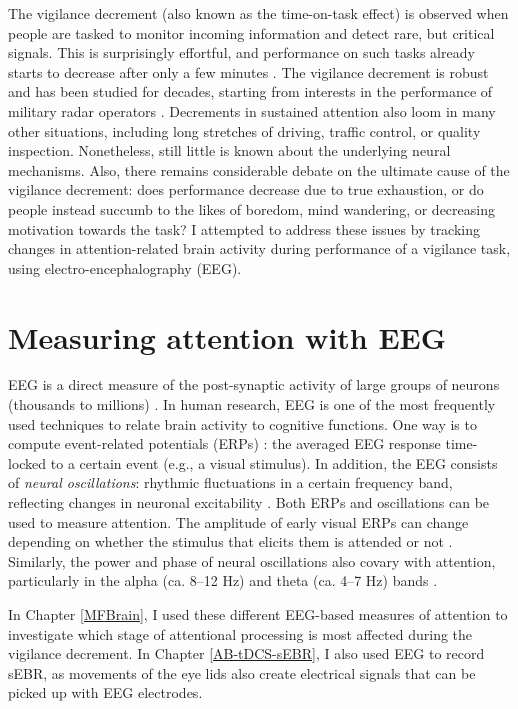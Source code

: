 \documentclass[11pt,]{memoir}
\begin{document}
The vigilance decrement (also known as the time-on-task effect) is observed when people are tasked to monitor incoming information and detect rare, but critical signals. This is surprisingly effortful, and performance on such tasks already starts to decrease after only a few minutes \autocite{Warm2008}. The vigilance decrement is robust and has been studied for decades, starting from interests in the performance of military radar operators \autocite{Mackworth1948}. Decrements in sustained attention also loom in many other situations, including long stretches of driving, traffic control, or quality inspection. Nonetheless, still little is known about the underlying neural mechanisms. Also, there remains considerable debate on the ultimate cause of the vigilance decrement: does performance decrease due to true exhaustion, or do people instead succumb to the likes of boredom, mind wandering, or decreasing motivation towards the task? I attempted to address these issues by tracking changes in attention-related brain activity during performance of a vigilance task, using electro-encephalography (EEG).

\hypertarget{measuring-attention-with-eeg}{%
\section{Measuring attention with EEG}\label{measuring-attention-with-eeg}}

EEG is a direct measure of the post-synaptic activity of large groups of neurons (thousands to millions) \autocite{Cohen2017}. In human research, EEG is one of the most frequently used techniques to relate brain activity to cognitive functions. One way is to compute event-related potentials (ERPs) \autocite{Luck2005}: the averaged EEG response time-locked to a certain event (e.g., a visual stimulus). In addition, the EEG consists of \emph{neural oscillations}: rhythmic fluctuations in a certain frequency band, reflecting changes in neuronal excitability \autocites{Buzsaki2004d}{Cohen2014}. Both ERPs and oscillations can be used to measure attention. The amplitude of early visual ERPs can change depending on whether the stimulus that elicits them is attended or not \autocites{Luck1994}{Mangun1991}{Slagter2016}. Similarly, the power and phase of neural oscillations also covary with attention, particularly in the alpha (ca. 8--12 Hz) and theta (ca. 4--7 Hz) bands \autocites{Clayton2015}{Klimesch2012}{VanDiepen2019}.

In Chapter \ref{MFBrain}, I used these different EEG-based measures of attention to investigate which stage of attentional processing is most affected during the vigilance decrement. In Chapter \ref{AB-tDCS-sEBR}, I also used EEG to record sEBR, as movements of the eye lids also create electrical signals that can be picked up with EEG electrodes.
\end{document}
